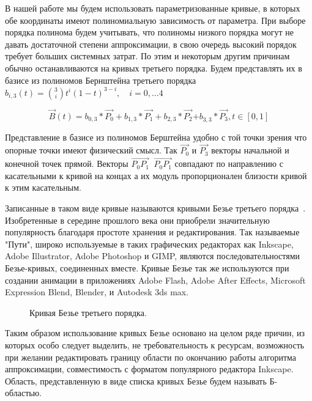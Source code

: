 \documentclass[a4paper,12pt]{report}
\begin{document}
В нашей работе мы будем использовать параметризованные кривые, в которых обе координаты имеют полиномиальную зависимость от параметра. При выборе порядка полинома будем учитывать, что полиномы низкого порядка могут не давать достаточной степени аппроксимации, в свою очередь высокий порядок требует больших системных затрат. По этим и некоторым другим причинам обычно останавливаются на кривых третьего порядка. Будем представлять их в базисе из полиномов Бернштейна третьего порядка ${b}_{i,3}(t)={3\choose i} t^i (1-t)^{3-i},\quad i=0,\ldots 4$ 

\begin{equation} \label{eq:bernstein} 
\overrightarrow{B}\left(t\right)=b_{0,3}*\overrightarrow{P_0}+b_{1,3}*\overrightarrow{P_1}+b_{2,3}*\overrightarrow{P_2}{+b}_{3,3}*\overrightarrow{P_3},       t\in [0,1] 
\end{equation}

Представление в базисе из полиномов Берштейна удобно с той точки зрения что опорные точки имеют физический смысл. Так $\overrightarrow{P_0}$ и  $\overrightarrow{P_3}$  векторы начальной и конечной точек прямой. Векторы  $\overrightarrow{P_0P_1}\ $ $\overrightarrow{P_0P_1}$ совпадают по направлению с касательными к кривой на концах а их модуль пропорционален близости кривой к этим касательным.  

Записанные в таком виде кривые называются кривыми Безье третьего порядка~\cite{bezier}. Изобретенные в середине прошлого века они приобрели значительную популярность благодаря простоте хранения и редактирования. Так называемые "Пути", широко используемые в таких графических редакторах как Inkscape, Adobe Illustrator, Adobe Photoshop и GIMP, являются последовательностями Безье-кривых, соединенных вместе. Кривые Безье так же используются при создании анимации в приложениях Adobe Flash, Adobe After Effects, Microsoft Expression Blend, Blender, и Autodesk 3ds max.

\begin{figure}[h]
\caption{Кривая Безье третьего порядка.}
\label{ris:bezier}
\end{figure}

Таким образом использование кривых Безье основано на целом ряде причин, из которых особо следует выделить, не требовательность к ресурсам, возможность при желании редактировать границу области по окончанию работы алгоритма аппроксимации, совместимость с форматом популярного редактора Inkscape. Область, представленную в виде списка кривых Безье будем называть Б-областью. 
\end{document}
